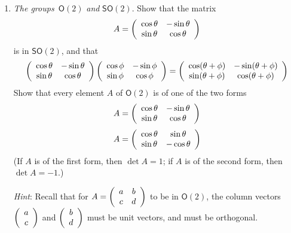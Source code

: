 \documentclass{amsbook}
\theoremstyle{plain}
\numberwithin{equation}{chapter}
\numberwithin{theorem}{chapter}
\begin{document}
\begin{enumerate}
\item \label{so2}\textit{The groups}\emph{\ }$\mathsf{O}(2)$ \textit{and}
$\mathsf{SO}(2)$. Show that the matrix
\[
A=\left(
\begin{array}
[c]{cc}%
\cos\theta & -\sin\theta\\
\sin\theta & \cos\theta
\end{array}
\right)
\]
is in $\mathsf{SO}(2)$, and that
\[
\left(
\begin{array}
[c]{cc}%
\cos\theta & -\sin\theta\\
\sin\theta & \cos\theta
\end{array}
\right)  \left(
\begin{array}
[c]{cc}%
\cos\phi & -\sin\phi\\
\sin\phi & \cos\phi
\end{array}
\right)  =\left(
\begin{array}
[c]{cc}%
\cos(\theta+\phi) & -\sin(\theta+\phi)\\
\sin(\theta+\phi) & \cos(\theta+\phi)
\end{array}
\right)
\]
Show that every element $A$ of $\mathsf{O}(2)$ is of one of the two forms
\[
A=\left(
\begin{array}
[c]{cc}%
\cos\theta & -\sin\theta\\
\sin\theta & \cos\theta
\end{array}
\right)
\]%
\[
A=\left(
\begin{array}
[c]{cc}%
\cos\theta & \sin\theta\\
\sin\theta & -\cos\theta
\end{array}
\right)
\]
(If $A$ is of the first form, then $\det A=1$; if $A$ is of the second form,
then $\det A=-1$.)

\textit{Hint}: Recall that for $A=\left(
\begin{array}
[c]{cc}%
a & b\\
c & d
\end{array}
\right)  $ to be in $\mathsf{O}(2)$, the column vectors $\left(
\begin{array}
[c]{c}%
a\\
c
\end{array}
\right)  $ and $\left(
\begin{array}
[c]{c}%
b\\
d
\end{array}
\right)  $ must be unit vectors, and must be orthogonal.


\end{enumerate}
\end{document}
